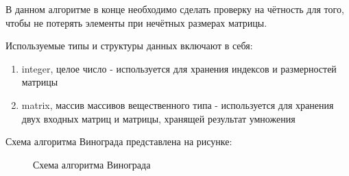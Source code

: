 В данном алгоритме в конце необходимо сделать проверку на чётность для того, чтобы не потерять элементы при нечётных размерах матрицы.

Используемые типы и структуры данных включают в себя:
\begin{enumerate}
	\item integer, целое число - используется для хранения индексов и размерностей матрицы
	\item matrix, массив массивов вещественного типа - используется для хранения двух входных матриц и матрицы, хранящей результат умножения
\end{enumerate}

Схема алгоритма Винограда представлена на рисунке:
\begin{figure}[ph!]
	\caption{Схема алгоритма Винограда}
\end{figure}

